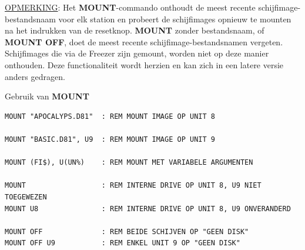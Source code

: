 \begin{description}[leftmargin=2cm,style=nextline]
                  \underline{OPMERKING}: Het {\bf MOUNT}-commando onthoudt de meest recente schijfimage-bestandsnaam voor elk station en probeert de schijfimages opnieuw te mounten na het indrukken van de resetknop. {\bf MOUNT} zonder bestandsnaam, of {\bf MOUNT OFF}, doet de meest recente schijfimage-bestandsnamen vergeten. Schijfimages die via de Freezer zijn gemount, worden niet op deze manier onthouden. Deze functionaliteit wordt herzien en kan zich in een latere versie anders gedragen.

\item [Voorbeelden:] Gebruik van {\bf MOUNT}

\begin{tcolorbox}[colback=black,coltext=white]
\verbatimfont{\codefont}
\begin{verbatim}
MOUNT "APOCALYPS.D81"  : REM MOUNT IMAGE OP UNIT 8

MOUNT "BASIC.D81", U9  : REM MOUNT IMAGE OP UNIT 9

MOUNT (FI$), U(UN%)    : REM MOUNT MET VARIABELE ARGUMENTEN

MOUNT                  : REM INTERNE DRIVE OP UNIT 8, U9 NIET TOEGEWEZEN
MOUNT U8               : REM INTERNE DRIVE OP UNIT 8, U9 ONVERANDERD

MOUNT OFF              : REM BEIDE SCHIJVEN OP "GEEN DISK"
MOUNT OFF U9           : REM ENKEL UNIT 9 OP "GEEN DISK"
\end{verbatim}
\end{tcolorbox}
\end{description}


\newpage
